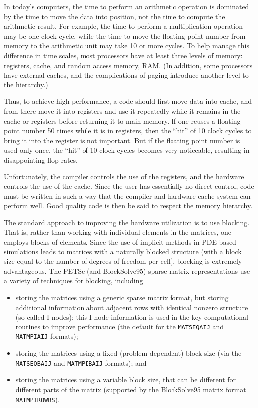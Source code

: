 In today's computers, the time to perform an arithmetic operation is
dominated by the time to move the data into position, not the time to
compute the arithmetic result.  For example, the time to perform a
multiplication operation may be one clock cycle, while the time to
move the floating point number from memory to the arithmetic unit may
take 10 or more cycles. To help manage this difference in time scales,
most processors have at least three levels of memory: registers,
cache, and random access memory, RAM. (In addition, some processors
have external caches, and the complications of paging introduce
another level to the hierarchy.)

Thus, to achieve high performance, a code should first move data into
cache, and from there move it into registers and use it repeatedly
while it remains in the cache or registers before returning it to main
memory. If one reuses a floating point number 50 times while it is in
registers, then the ``hit'' of 10 clock cycles to bring it into the
register is not important. But if the floating point number is used
only once, the ``hit'' of 10 clock cycles becomes very noticeable,
resulting in disappointing flop rates.

Unfortunately, the compiler controls the use of the registers, and the
hardware controls the use of the cache. Since the user has essentially
no direct control, code must be written in such a way that the
compiler and hardware cache system can perform well. Good quality code
is then be said to respect the memory hierarchy.

The standard approach to improving the hardware utilization is to use
blocking. That is, rather than working with individual elements in
the matrices, one employs blocks of elements.  Since the use of
implicit methods in PDE-based simulations leads to matrices with a
naturally blocked structure (with a block size equal to the number of
degrees of freedom per cell), blocking is extremely advantageous.  The
PETSc (and BlockSolve95) sparse matrix representations use a variety
of techniques for blocking, including

\begin{itemize}
\item storing the matrices using a generic sparse matrix format, but 
   storing additional information about adjacent rows with identical 
   nonzero structure (so called I-nodes); this I-node information is 
   used in the key computational routines to improve performance
   (the default for the {\tt MATSEQAIJ} and {\tt MATMPIAIJ} formats);
\item storing the matrices using a fixed (problem dependent) block size
   (via the {\tt MATSEQBAIJ} and {\tt MATMPIBAIJ} formats); and
\item storing the matrices using a variable block size, that can be 
   different for different parts of the matrix
   (supported by the BlockSolve95 matrix format {\tt MATMPIROWBS}).
\end{itemize}


